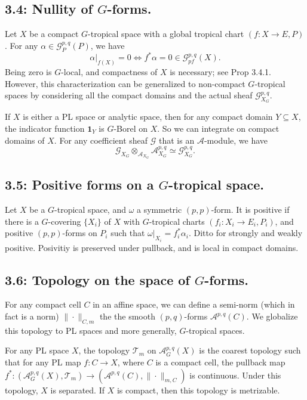 \documentclass[12pt,reqno]{amsart}
\theoremstyle{definition}
\theoremstyle{remark}
\theoremstyle{citedrem}
\theoremstyle{cited}
\theoremstyle{citeddef}
\theoremstyle{step}
\begin{document}
\subsection*{3.4: Nullity of $G$-forms.} Let $X$ be a compact $G$-tropical space with a global tropical chart $(f\colon X \to E, P)$. For any $\alpha \in \mathcal{G}_P^{p,q}(P)$, we have \[\alpha|_{f(X)} = 0 \iff f^*\alpha = 0 \in \mathcal{G}_{pf}^{p,q}(X).\] Being zero is $G$-local, and compactness of $X$ is necessary; see Prop 3.4.1. However, this characterization can be generalized to non-compact $G$-tropical spaces by considering all the compact domains and the actual sheaf $\mathcal{G}_{X_G}^{p,q}$. 

If $X$ is either a PL space or analytic space, then for any compact domain $Y \subseteq X$, the indicator function $\mathbf{1}_Y$ is $G$-Borel on $X$. So we can integrate on compact domains of $X$. For any coefficient sheaf $\mathcal{G}$ that is an $\mathcal{A}$-module, we have \[\mathcal{G}_{X_G} \otimes_{\mathcal{A}_{X_G}} \mathcal{A}_{X_G}^{p,q} \simeq \mathcal{G}_{X_G}^{p,q}.\]

\subsection*{3.5: Positive forms on a $G$-tropical space.}
Let $X$ be a $G$-tropical space, and $\omega$ a symmetric $(p,p)$-form. It is positive if there is a $G$-covering $\{X_i\}$ of $X$ with $G$-tropical charts $(f_i \colon X_i \to E_i, P_i)$, and positive $(p,p)$-forms on $P_i$ such that $\omega|_{X_i} = f_i^*\alpha_i$. Ditto for strongly and weakly positive. Posivitiy is preserved under pullback, and is local in compact domains. 

\subsection*{3.6: Topology on the space of $G$-forms.}
For any compact cell $C$ in an affine space, we can define a semi-norm (which in fact is a norm) $\| \cdot \|_{C,m}$ the the smooth $(p,q)$-forms $\mathcal{A}^{p,q}(C)$. We globalize this topology to PL spaces and more generally, $G$-tropical spaces. 

For any PL space $X$, the topology $\mathcal{T}_m$ on $\mathcal{A}^{p,q}_{G}(X)$ is the coarest topology such that for any PL map $f \colon C \to X$, where $C$ is a compact cell, the pullback map $f^* \colon (\mathcal{A}^{p,q}_{G}(X), \mathcal{T}_m) \to (\mathcal{A}^{p,q}(C), \|\cdot \|_{m, C})$ is continuous. Under this topology, $X$ is separated. If $X$ is compact, then this topology is metrizable. 
\end{document}
